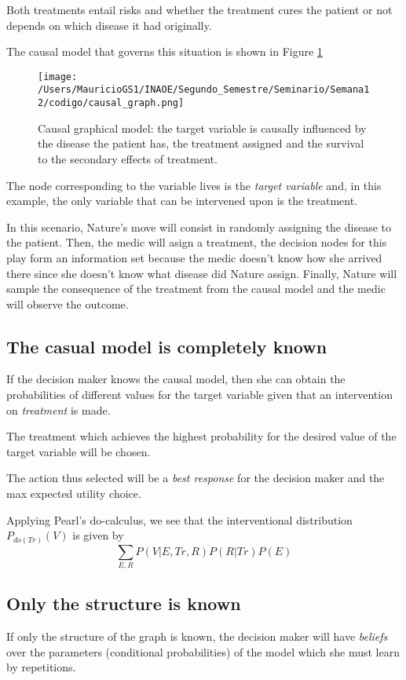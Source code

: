 \documentclass{article}
\begin{document}
Both treatments entail risks and whether the treatment cures the patient or not depends on which disease it had originally.

The causal model that governs this situation is shown in Figure \ref{causal_model}

\begin{figure}[ht]
\vskip 0.2in
\begin{center}
\centerline{\texttt{[image: /Users/MauricioGS1/INAOE/Segundo\_Semestre/Seminario/Semana12/codigo/causal\_graph.png]}}
\caption{Causal graphical model: the target variable is causally influenced by the disease the patient has, the treatment assigned and the survival to the secondary effects of treatment.}
\label{causal_model}
\end{center}
\vskip -0.2in
\end{figure}

The node corresponding to the variable lives is the \textit{target variable} and, in this example, the only variable that can be intervened upon is the treatment.

In this scenario, Nature's move will consist in randomly assigning the disease to the patient. Then, the medic will asign a treatment, the decision nodes for this play form an information set because the medic doesn't know how she arrived there since she doesn't know what disease did Nature assign. Finally, Nature will sample the consequence of the treatment from the causal model and the medic will observe the outcome.

\subsection{The casual model is completely known}
If the decision maker knows the causal model, then she can obtain the probabilities of different values for the target variable given that an intervention on \textit{treatment} is made. 

The treatment which achieves the highest probability for the desired value of the target variable will be chosen.

The action thus selected will be a \textit{best response} for the decision maker and the max expected utility choice.

Applying Pearl's \cite{pearl2009causality} do-calculus, we see that the interventional distribution $P_{do(Tr)}(V)$ is given by
\[ \sum_{E,R}P(V|E,Tr,R)P(R|Tr)P(E) \]
\subsection{Only the structure is known}
If only the structure of the graph is known, the decision maker will have \textit{beliefs} over the parameters (conditional probabilities) of the model which she must learn by repetitions.
\end{document}
